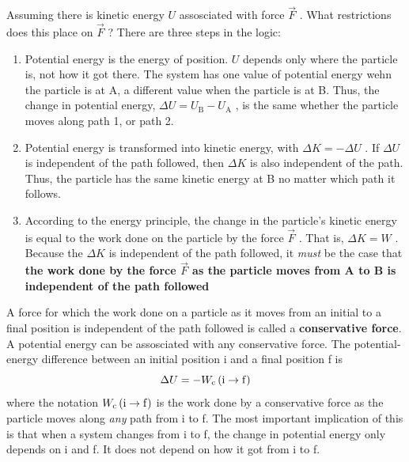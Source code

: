 Assuming there is kinetic energy
$
    U
$ assosciated with force
$
    \vec{F}
$%
.  What restrictions does this place on
$
    \vec{F}
$%
?  There are three steps in the logic:
\begin{enumerate}
    \item
        Potential energy is the energy of position.
        $
            U
        $ depends only where the particle is, not how it got there.  The
        system has one value of potential energy wehn the particle is at
        A, a different value when the particle is at B. Thus, the change
        in potential energy,
        $
            \Delta U = U_\mathrm{B} - U_\mathrm{A}
        $%
        , is the same whether the particle moves along path 1, or path
        2.
    \item
        Potential energy is transformed into kinetic energy, with
        $
            \Delta K = - \Delta U
        $%
.        If
        $
            \Delta U
        $ is independent of the path followed, then
        $
            \Delta K
        $ is also independent of the path.  Thus, the particle has the
        same kinetic energy at B no matter which path it follows.
    \item
        According to the energy principle, the change in the particle's
        kinetic energy is equal to the work done on the particle by the
        force
        $
            \vec{F}
        $%
.        That is,
        $
            \Delta K = W
        $%
.        Because the
        $
            \Delta K
        $ is independent of the path followed, it \emph{must} be the
        case that \textbf{the work done by the force
        $
            \vec{F}
        $ as the particle moves from A to B is independent of the path
        followed}
\end{enumerate}
A force for which the work done on a particle as it moves from an
initial to a final position is independent of the path followed is
called a \textbf{conservative force}.  A potential energy can be
assosciated with any conservative force.  The potential-energy
difference between an initial position i and a final position f is
\begin{equation}
    \Delta U = -W_\mathrm{c} \left(\mathrm{i}\to\mathrm{f}\right)
\end{equation}
where the notation
$
    W_\mathrm{c} \left(\mathrm{i}\to\mathrm{f}\right)
$ is the work done by a conservative force as the particle moves along
\emph{any} path from i to f.  The most important implication of this is
that when a system changes from i to f, the change in potential energy
only depends on i and f.  It does not depend on how it got from i to f.

